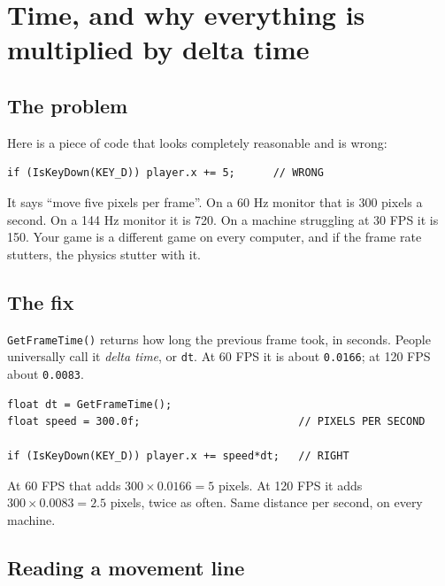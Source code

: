 \chapter{Time, and why everything is multiplied by delta time}

\section{The problem}

Here is a piece of code that looks completely reasonable and is wrong:

\begin{lstlisting}
if (IsKeyDown(KEY_D)) player.x += 5;      // WRONG
\end{lstlisting}

It says ``move five pixels per frame''. On a 60 Hz monitor that is 300 pixels a
second. On a 144 Hz monitor it is 720. On a machine struggling at 30 FPS it is
150. Your game is a different game on every computer, and if the frame rate
stutters, the physics stutter with it.

\section{The fix}

\lstinline|GetFrameTime()| returns how long the previous frame took, in seconds.
People universally call it \emph{delta time}, or \lstinline|dt|. At 60 FPS it is
about \lstinline|0.0166|; at 120 FPS about \lstinline|0.0083|.

\begin{lstlisting}
float dt = GetFrameTime();
float speed = 300.0f;                         // PIXELS PER SECOND

if (IsKeyDown(KEY_D)) player.x += speed*dt;   // RIGHT
\end{lstlisting}

At 60 FPS that adds $300 \times 0.0166 = 5$ pixels. At 120 FPS it adds
$300 \times 0.0083 = 2.5$ pixels, twice as often. Same distance per second, on
every machine.


\section{Reading a movement line}

